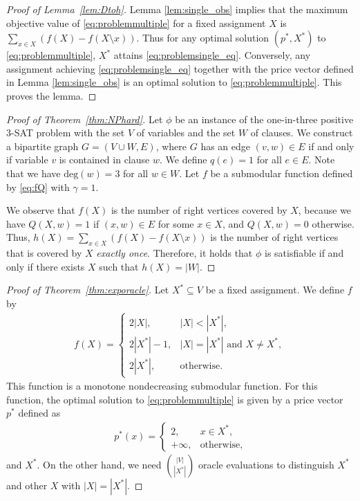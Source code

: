 \documentclass[letterpaper]{article}
\theoremstyle{definition}
\begin{document}
\begin{proof}[Proof of Lemma~\ref{lem:Dtoh}]
Lemma \ref{lem:single_obs} implies that the maximum objective value of \eqref{eq:problemmultiple} for a fixed assignment $X$ is $\sum_{x \in X} (f(X) - f(X \setminus x))$. 
Thus for any optimal solution $(p^*, X^*)$ to \eqref{eq:problemmultiple}, $X^*$ attains \eqref{eq:problemsingle_eq}. 
Conversely, any assignment achieving \eqref{eq:problemsingle_eq} together with the price vector defined in Lemma \ref{lem:single_obs} is an optimal solution to \eqref{eq:problemmultiple}. 
This proves the lemma.
\end{proof}

\begin{proof}[Proof of Theorem~\ref{thm:NPhard}]
Let $\phi$ be an instance of the one-in-three positive 3-SAT problem with the set $V$ of variables and the set $W$ of clauses. 
We construct a bipartite graph $G=(V \cup W, E)$, where $G$ has an edge $(v, w) \in E$ if and only if variable $v$ is contained in clause $w$. 
We define $q(e)=1$ for all $e \in E$. 
Note that we have $\mathrm{deg}(w) = 3$ for all $w \in W$. 
Let $f$ be a submodular function defined by \eqref{eq:fQ} with $\gamma = 1$.

We observe that $f(X)$ is the number of right vertices covered by $X$, because we have $Q(X, w) = 1$ if $(x, w) \in E$ for some $x \in X$, and $Q(X, w) = 0$ otherwise. 
Thus, $h(X) = \sum_{x \in X} (f(X) - f(X \setminus x))$ is the number of right vertices that is covered by $X$ \emph{exactly once}. 
Therefore, it holds that $\phi$ is satisfiable if and only if there exists $X$ such that $h(X) = |W|$.
\end{proof}

\begin{proof}[Proof of Theorem~\ref{thm:exporacle}]
Let $X^* \subseteq V$ be a fixed assignment. We define $f$ by 
\begin{align}
  f(X) = \begin{cases}
    2|X|, & |X| < |X^*|, \\
    2|X^*| - 1, & |X| = |X^*| \text{ and } X \neq X^*, \\
    2|X^*|, & \text{otherwise}.
  \end{cases}
\end{align}
This function is a monotone nondecreasing submodular function.
For this function, the optimal solution to \eqref{eq:problemmultiple} is given by a price vector $p^*$ defined as
\begin{align}
  p^*(x) = \begin{cases}
    2, & x \in X^*, \\
    +\infty, & \text{otherwise,}
  \end{cases}
\end{align}
and $X^*$.
On the other hand, we need %
${|V| \choose |X^*|}$ %
oracle evaluations to distinguish $X^*$ and other $X$ with $|X| = |X^*|$.
\end{proof}
\end{document}
